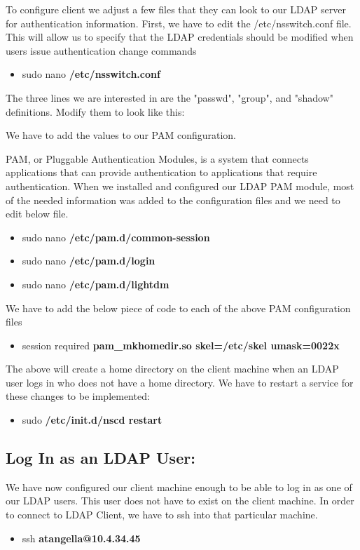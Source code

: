 \documentclass[12pt]{report}
\begin{document}
		To configure client we adjust a few files that they can look to our LDAP server for authentication information.
		First, we have to edit the /etc/nsswitch.conf file. This will allow us to specify that the LDAP credentials should be modified when users issue authentication change commands
		\begin{itemize}
		\item sudo nano \textbf{/etc/nsswitch.conf}
		\end{itemize}
		\pagebreak
		The three lines we are interested in are the "passwd", "group", and "shadow" definitions. 
		Modify them to look like this:
		
		
		We have to add the values to our PAM configuration.
		
		PAM, or Pluggable Authentication Modules, is a system that connects applications that can provide authentication to applications that require authentication.
		When we installed and configured our LDAP PAM module, most of the needed information was added to the configuration files and we need to edit below file.
		\begin{itemize}
		\item sudo nano \textbf{/etc/pam.d/common-session}
		\item sudo nano \textbf{/etc/pam.d/login}
		\item sudo nano \textbf{/etc/pam.d/lightdm}
		\end{itemize}
		
	We have to add the below piece of code to each of the above PAM configuration files
		\begin{itemize}
		\item session required \textbf{pam\_mkhomedir.so skel=/etc/skel umask=0022x}
		\end{itemize}
		
		The above will create a home directory on the client machine when an LDAP user logs in who does not have a home directory.
		We have to restart a service for these changes to be implemented:
		\begin{itemize}
		\item sudo \textbf{/etc/init.d/nscd restart}		
		\end{itemize}
		
		\subsection{Log In as an LDAP User:}
		We have now configured our client machine enough to be able to log in as one of our LDAP users. This user does not have to exist on the client machine.
		In order to connect to LDAP Client, we have to ssh into that particular machine.
		\begin{itemize}
		\item ssh \textbf{atangella@10.4.34.45}
		\end{itemize}
\pagebreak
\end{document}

